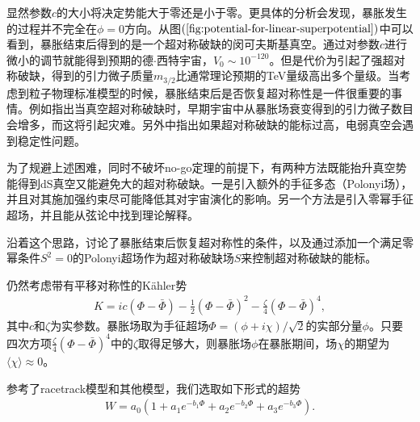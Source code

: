 显然参数$c$的大小将决定势能大于零还是小于零。更具体的分析会发现，暴胀发生的过程并不完全在$\phi=0$方向。从图$(\ref{fig:potential-for-linear-superpotential})$中可以
看到，暴胀结束后得到的是一个超对称破缺的闵可夫斯基真空。通过对参数$c$进行微小的调节就能得到预期的德$\cdot$西特宇宙，$V_0\sim
10^{-120}$。但是代价为引起了强超对称破缺，得到的引力微子质量$m_{3/2}$比通常理论预期的TeV量级高出多个量级。当考虑到粒子物理标准模型的时候，暴胀结束后是否恢复超对称性是一件很重要的事情。例如\citep{endo2006moduli,nakamura2006gravitino,kawasaki2006gravitino,kawasaki2006gravitino-overproduction,asaka2006gravitinos}指出当真空超对称破缺时，早期宇宙中从暴胀场衰变得到的引力微子数目会增多，而这将引起灾难。另外\citep{degrassi2012higgs}中指出如果超对称破缺的能标过高，电弱真空会遇到稳定性问题。

为了规避上述困难，同时不破坏no-go定理的前提下，有两种方法既能抬升真空势能得到dS真空又能避免大的超对称破缺。一是引入额外的手征多态（Polonyi场），并且对其施加强约束尽可能降低其对宇宙演化的影响\citep{dudas2013strong}。另一个方法是引入零幂手征超场\citep{ferrara2014cosmology,kallosh2015inflation,dall2014sgoldstino,kallosh2015inflation-de-sitter,linde2015does}，并且能从弦论中找到理论解释\citep{kallosh2014emergence}。

沿着这个思路，\citep{ketov2016susy}讨论了暴胀结束后恢复超对称性的条件，以及通过添加一个满足零幂条件$S^2=0$的Polonyi超场作为超对称破缺场$S$来控制超对称破缺的能标。


仍然考虑带有平移对称性的K\"ahler势\citep{ketov2016susy}
\begin{align}
    K=ic(\Phi-\bar\Phi)-\frac{1}{2}{(\Phi-\bar\Phi)}^2-\frac{\zeta}{4}{(\Phi-\bar\Phi)}^4,
\end{align}
其中$c$和$\zeta$为实参数。暴胀场取为手征超场$\Phi=(\phi+i\chi)/\sqrt{2}$的实部分量$\phi$。只要四次方项$\frac{\zeta}{4}{(\Phi-\bar\Phi)}^4$中的$\zeta$取得足够大，则暴胀场$\phi$在暴胀期间，场$\chi$的期望为$\langle\chi\rangle\approx0$。

参考了racetrack模型\citep{krasnikov1987supersymmetry,escoda2003saltatory,blanco2005racetrack}和其他模型\citep{ketov2016susy}，我们选取如下形式的超势
\begin{align}
    W=a_0(1+a_1e^{-b_1\Phi}+a_2e^{-b_2\Phi}+a_3e^{-b_3\Phi}).
\end{align}

